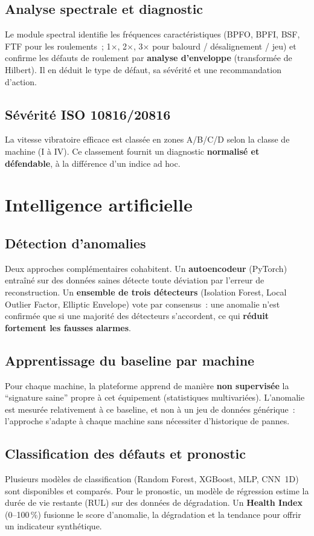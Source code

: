 \documentclass[12pt,a4paper]{article}
\begin{document}
\subsection{Analyse spectrale et diagnostic}
Le module spectral identifie les fréquences caractéristiques (BPFO, BPFI, BSF, FTF pour
les roulements~; 1$\times$, 2$\times$, 3$\times$ pour balourd / désalignement / jeu) et
confirme les défauts de roulement par \textbf{analyse d'enveloppe} (transformée de
Hilbert). Il en déduit le type de défaut, sa sévérité et une recommandation d'action.

\subsection{Sévérité ISO 10816/20816}
La vitesse vibratoire efficace est classée en zones A/B/C/D selon la classe de machine
(I à IV). Ce classement fournit un diagnostic \textbf{normalisé et défendable}, à la
différence d'un indice ad hoc.

\section{Intelligence artificielle}

\subsection{Détection d'anomalies}
Deux approches complémentaires cohabitent. Un \textbf{autoencodeur} (PyTorch) entraîné sur
des données saines détecte toute déviation par l'erreur de reconstruction. Un
\textbf{ensemble de trois détecteurs} (Isolation Forest, Local Outlier Factor, Elliptic
Envelope) vote par consensus~: une anomalie n'est confirmée que si une majorité des
détecteurs s'accordent, ce qui \textbf{réduit fortement les fausses alarmes}.

\subsection{Apprentissage du baseline par machine}
Pour chaque machine, la plateforme apprend de manière \textbf{non supervisée} la
``signature saine'' propre à cet équipement (statistiques multivariées). L'anomalie est
mesurée relativement à ce baseline, et non à un jeu de données générique~: l'approche
s'adapte à chaque machine sans nécessiter d'historique de pannes.

\subsection{Classification des défauts et pronostic}
Plusieurs modèles de classification (Random Forest, XGBoost, MLP, CNN~1D) sont disponibles
et comparés. Pour le pronostic, un modèle de régression estime la durée de vie restante
(RUL) sur des données de dégradation. Un \textbf{Health Index} (0--100\,\%) fusionne le
score d'anomalie, la dégradation et la tendance pour offrir un indicateur synthétique.
\end{document}
